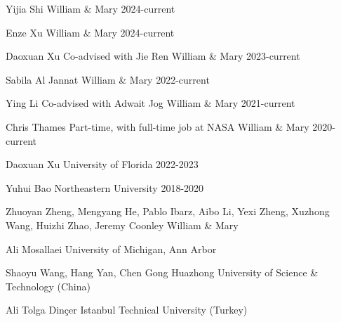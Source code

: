 

\cvmentee
{Yijia Shi}
{}
{William \& Mary}
{2024-current}

\cvmentee
{Enze Xu}
{}
{William \& Mary}
{2024-current}

\cvmentee
{Daoxuan Xu}
{Co-advised with Jie Ren}
{William \& Mary}
{2023-current}

\cvmentee
{Sabila Al Jannat}
{}
{William \& Mary}
{2022-current}

\cvmentee
{Ying Li}
{Co-advised with Adwait Jog}
{William \& Mary}
{2021-current}

\cvmentee
{Chris Thames}
{Part-time, with full-time job at NASA}
{William \& Mary}
{2020-current}




\cvmentee
{Daoxuan Xu}
{}
{University of Florida}
{2022-2023}

\cvmentee
{Yuhui Bao}
{}
{Northeastern University}
{2018-2020}


\cvmenteegroup
{
    Zhuoyan Zheng,
    Mengyang He,
    Pablo Ibarz,
    Aibo Li,
    Yexi Zheng,
    Xuzhong Wang,
    Huizhi Zhao,
    Jeremy Coonley
}
{William \& Mary}

\cvmenteegroup
{
    Ali Mosallaei
}
{
    University of Michigan, Ann Arbor
}


\cvmenteegroup
{
    Shaoyu Wang, Hang Yan, Chen Gong
}
{
    Huazhong University of Science \& Technology (China)
}

\cvmenteegroup
{
    Ali Tolga Din\c{c}er
}
{
    Istanbul Technical University (Turkey)
}

